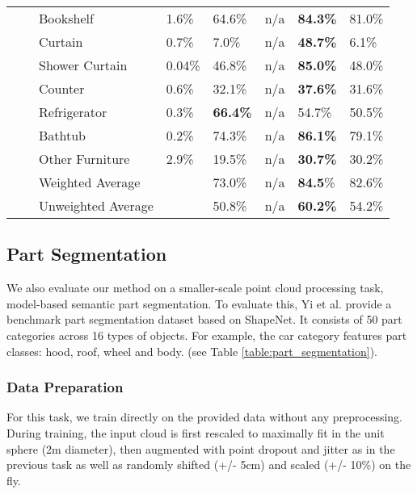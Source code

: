 \documentclass[runningheads]{llncs}
\begin{document}
\begin{table}[h]
{{\begin{tabular}{p{0.5cm}p{0.1cm}p{3.5cm}p{3cm}p{2.3cm}p{2.8cm}p{2.5cm}p{2.3cm}}
\cellcolor{BookshelfColor}& & Bookshelf	&	1.6\%	& 	64.6\% &n/a	& \textbf{84.3\%} & 81.0\%
\\\arrayrulecolor{white}\hline
\cellcolor{CurtainColor} && Curtain	&	0.7\%	&	7.0\% &n/a	& \textbf{48.7\%} & 6.1\% 
\\\arrayrulecolor{white}\hline
\cellcolor{ShowerCurtainColor} && Shower Curtain	&	0.04\%	&	46.8\% &n/a  & \textbf{85.0\%} & 48.0\% \\\arrayrulecolor{white}\hline
\cellcolor{CounterColor} && Counter	&	0.6\%	&	32.1\%	&n/a &  \textbf{37.6\%} & 31.6\% 
\\\arrayrulecolor{white}\hline
\cellcolor{RefrigeratorColor} && Refrigerator	&	0.3\%	&	\textbf{66.4\%}	&n/a & 54.7\% & 50.5\% 
\\\arrayrulecolor{white}\hline
\cellcolor{BathtubColor} && Bathtub	&	0.2\%	&	74.3\%	&n/a & \textbf{86.1\%} & 79.1\% \\\arrayrulecolor{white}\hline
\cellcolor{OtherFurnitureColor} && Other Furniture	&	2.9\%	&	19.5\%	&n/a & \textbf{30.7\%} & 30.2\%
\\\arrayrulecolor{black}\hline
&& Weighted Average & & 73.0\% & n/a & \textbf{84.5}\% & 82.6\% \\
&& Unweighted Average & & 50.8\% & n/a & \textbf{60.2\%} & 54.2\% \\
\end{tabular}}}
\end{table}

\subsection{Part Segmentation}
\label{section:EvalPartSegmentation}

We also evaluate our method on a smaller-scale point cloud processing task, model-based semantic part segmentation. To evaluate this, Yi et al. \cite{Yi16} provide a benchmark part segmentation dataset based on ShapeNet. It consists of 50 part categories across 16 types of objects. For example, the car category features part classes: hood, roof, wheel and body. (see Table \ref{table:part_segmentation}).

\subsubsection{Data Preparation}

For this task, we train directly on the provided data without any preprocessing. During training, the input cloud is first rescaled to maximally fit in the unit sphere (2m diameter), then augmented with point dropout and jitter as in the previous task as well as randomly shifted (+/- 5cm) and scaled (+/- 10\%) on the fly.
\end{document}
